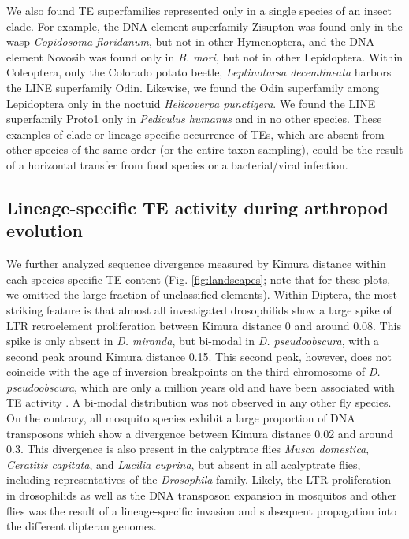 We also found TE superfamilies represented only in a single species of
an insect clade. For example, the DNA element superfamily Zisupton was
found only in the wasp \emph{Copidosoma floridanum}, but not in other
Hymenoptera, and the DNA element Novosib was found only in \emph{B.
mori}, but not in other Lepidoptera. Within Coleoptera, only the
Colorado potato beetle, \emph{Leptinotarsa decemlineata} harbors the
LINE superfamily Odin. Likewise, we found the Odin superfamily among
Lepidoptera only in the noctuid \emph{Helicoverpa punctigera}. We found
the LINE superfamily Proto1 only in \emph{Pediculus humanus} and in no
other species. These examples of clade or lineage specific occurrence of
TEs, which are absent from other species of the same order (or the
entire taxon sampling), could be the result of a horizontal transfer
from food species or a bacterial/viral infection.



\subsection{Lineage-specific TE activity during arthropod evolution}

We further analyzed sequence divergence measured by Kimura distance
within each species-specific TE content (Fig. \ref{fig:landscapes}; note
that for these plots, we omitted the large fraction of unclassified
elements). Within Diptera, the most striking feature is that almost all
investigated drosophilids show a large spike of LTR retroelement
proliferation between Kimura distance 0 and around 0.08. This spike is
only absent in \emph{D. miranda}, but bi-modal in \emph{D.
pseudoobscura}, with a second peak around Kimura distance 0.15. This
second peak, however, does not coincide with the age of inversion
breakpoints on the third chromosome of \emph{D. pseudoobscura}, which
are only a million years old and have been associated with TE activity
\citep{Wallace2011}. A bi-modal distribution was not observed in any
other fly species. On the contrary, all mosquito species exhibit a large
proportion of DNA transposons which show a divergence between Kimura
distance 0.02 and around 0.3. This divergence is also present in the
calyptrate flies \emph{Musca domestica}, \emph{Ceratitis capitata}, and
\emph{Lucilia cuprina}, but absent in all acalyptrate flies, including
representatives of the \emph{Drosophila} family. Likely, the LTR
proliferation in drosophilids as well as the DNA transposon expansion in
mosquitos and other flies was the result of a lineage-specific invasion
and subsequent propagation into the different dipteran genomes.


